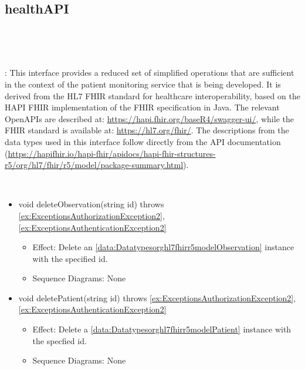   \subsection{healthAPI}\label{int:InterfaceshealthAPI}
    \begin{description}
      \item[Provided by:] \iconcomponent{}~
      \item[Required by:] \iconcomponent{}~ 
           \item[Description]: This interface provides a reduced set of simplified operations that are sufficient in the context of the patient monitoring service that is being developed.
It is derived from the HL7 FHIR standard for healthcare interoperability, based on the HAPI FHIR implementation of the FHIR specification in Java. The relevant OpenAPIs are described at: \url{https://hapi.fhir.org/baseR4/swagger-ui/}, while the FHIR standard is available at: \url{https://hl7.org/fhir/}.
The descriptions from the data types used in this interface follow directly from the API documentation (\url{https://hapifhir.io/hapi-fhir/apidocs/hapi-fhir-structures-r5/org/hl7/fhir/r5/model/package-summary.html}).
      \item[Operations:] ~
    \begin{itemize}[noitemsep,nolistsep,leftmargin=-.25cm]
      \item \textsf{void deleteObservation(string id) throws \ref{ex:ExceptionsAuthorizationException2}, \ref{ex:ExceptionsAuthenticationException2}}
        \begin{itemize}[noitemsep,nolistsep]
           \item Effect: Delete an \ref{data:Datatypesorghl7fhirr5modelObservation} instance with the specified id. 
           \item Sequence Diagrams: None
        \end{itemize}
      \item \textsf{void deletePatient(string id) throws \ref{ex:ExceptionsAuthorizationException2}, \ref{ex:ExceptionsAuthenticationException2}}
        \begin{itemize}[noitemsep,nolistsep]
           \item Effect: Delete a \ref{data:Datatypesorghl7fhirr5modelPatient} instance with the specfied id. 
           \item Sequence Diagrams: None
        \end{itemize}

\end{itemize}
\end{description}
